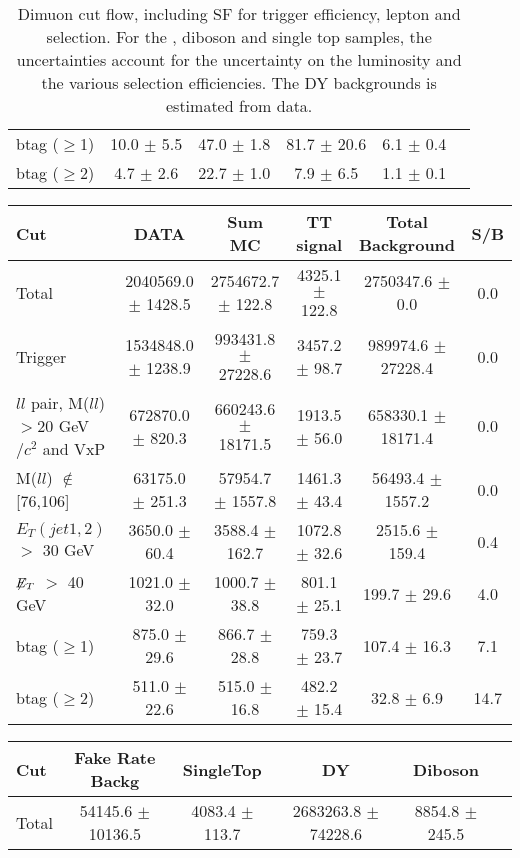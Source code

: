 \documentclass[amsmath,amssymb]{revtex4}
\begin{document}
\begin{landscape}
\begin{table}[p]
\begin{tabular}{|l|c|c|c|c|c|}
btag ($\ge$1) & 10.0 $\pm$ 5.5 & 47.0 $\pm$ 1.8 & 81.7 $\pm$ 20.6 & 6.1 $\pm$ 0.4 \\
btag ($\ge$2) & 4.7 $\pm$ 2.6 & 22.7 $\pm$ 1.0 & 7.9 $\pm$ 6.5 & 1.1 $\pm$ 0.1 \\
\hline 
\hline
\end{tabular}
\caption{Dimuon cut flow, including SF for trigger efficiency, lepton and \met selection. For the \ttbar, diboson and single top samples, the uncertainties account for the uncertainty on the luminosity and the various selection efficiencies. The DY backgrounds is estimated from data.}
\label{Table:CutFlow_mumu}
\end{table}
\end{landscape}
\clearpage
\begin{landscape}
\begin{table}[p]
\begin{tabular}{|l|c|c|c|c|c|}
\hline
\hline
Cut & DATA & Sum MC & TT signal  & Total Background & S/B \\
\hline
Total & 2040569.0 $\pm$ 1428.5 & 2754672.7 $\pm$ 122.8 & 4325.1 $\pm$ 122.8 & 2750347.6 $\pm$ 0.0 & 0.0 \\
Trigger & 1534848.0 $\pm$ 1238.9 & 993431.8 $\pm$ 27228.6 & 3457.2 $\pm$ 98.7 & 989974.6 $\pm$ 27228.4 & 0.0 \\
$ll$ pair, M($ll$)$>$20 GeV$/c^2$ and VxP & 672870.0 $\pm$ 820.3 & 660243.6 $\pm$ 18171.5 & 1913.5 $\pm$ 56.0 & 658330.1 $\pm$ 18171.4 & 0.0 \\
M($ll$) $\notin$ [76,106] & 63175.0 $\pm$ 251.3 & 57954.7 $\pm$ 1557.8 & 1461.3 $\pm$ 43.4 & 56493.4 $\pm$ 1557.2 & 0.0 \\
$E_T(jet1,2)$ $>$ 30 GeV & 3650.0 $\pm$ 60.4 & 3588.4 $\pm$ 162.7 & 1072.8 $\pm$ 32.6 & 2515.6 $\pm$ 159.4 & 0.4 \\
$\not\!\!E_T$ $>$ 40 GeV & 1021.0 $\pm$ 32.0 & 1000.7 $\pm$ 38.8 & 801.1 $\pm$ 25.1 & 199.7 $\pm$ 29.6 & 4.0 \\
btag ($\ge$1) & 875.0 $\pm$ 29.6 & 866.7 $\pm$ 28.8 & 759.3 $\pm$ 23.7 & 107.4 $\pm$ 16.3 & 7.1 \\
btag ($\ge$2) & 511.0 $\pm$ 22.6 & 515.0 $\pm$ 16.8 & 482.2 $\pm$ 15.4 & 32.8 $\pm$ 6.9 & 14.7 \\
\hline
\hline
\end{tabular}
\begin{tabular}{|l|c|c|c|c|c|}
\hline
\hline
Cut & Fake Rate Backg & SingleTop & DY & Diboson  \\
\hline
Total & 54145.6 $\pm$ 10136.5 & 4083.4 $\pm$ 113.7 & 2683263.8 $\pm$ 74228.6 & 8854.8 $\pm$ 245.5 \\

\end{tabular}
\end{table}
\end{landscape}
\end{document}
